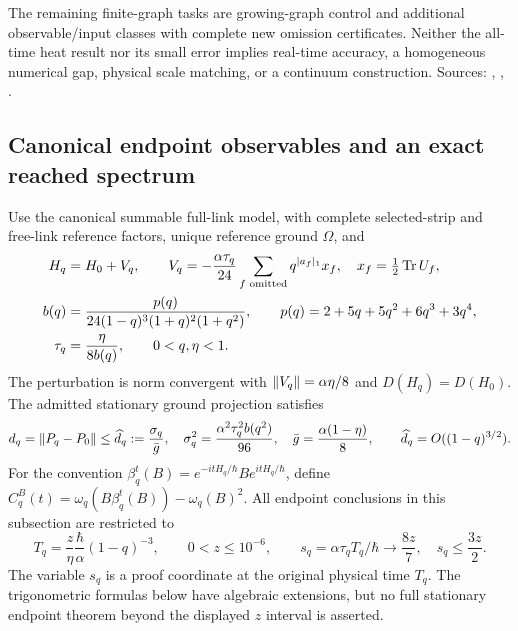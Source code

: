 The remaining finite-graph tasks are growing-graph control and additional
observable/input classes with complete new omission certificates.  Neither the
all-time heat result nor its small error implies real-time accuracy, a
homogeneous numerical gap, physical scale matching, or a continuum construction.
Sources: ,
,
.

\subsection{Canonical endpoint observables and an exact reached spectrum}
\label{recent:canonical}

Use the canonical summable full-link model, with complete selected-strip and
free-link reference factors, unique reference ground $\Omega$, and
\begin{align}
 H_q&=H_0+V_q,\qquad
 V_q=-\frac{\alpha\tau_q}{24}\sum_{f\text{ omitted}}q^{|a_f|_1}x_f,
 \quad x_f=\tfrac12\operatorname{Tr} U_f,\notag\\
 b(q)&=\frac{p(q)}{24(1-q)^3(1+q)^2(1+q^2)},\qquad
 p(q)=2+5q+5q^2+6q^3+3q^4,\notag\\
 \tau_q&=\frac{\eta}{8b(q)},\qquad0<q,\eta<1.
 \label{recent:canonical-profile}
\end{align}
The perturbation is norm convergent with $\left\lVert V_q\right\rVert=\alpha\eta/8$ and
$D(H_q)=D(H_0)$.  The admitted stationary ground projection satisfies
\begin{equation}
 d_q=\left\lVert P_q-P_0\right\rVert\le\widehat d_q:=\frac{\sigma_q}{\bar g},\quad
 \sigma_q^2=\frac{\alpha^2\tau_q^2b(q^2)}{96},\quad
 \bar g=\frac{\alpha(1-\eta)}8,
 \qquad\widehat d_q=O((1-q)^{3/2}).
 \label{recent:canonical-state}
\end{equation}
For the convention $\beta_q^t(B)=e^{-itH_q/\hbar}Be^{itH_q/\hbar}$, define
$C_q^B(t)=\omega_q(B\beta_q^t(B))-\omega_q(B)^2$.
All endpoint conclusions in this subsection are restricted to
\begin{equation}
 T_q=\frac z\eta\frac\hbar\alpha(1-q)^{-3},\qquad
 0<z\le10^{-6},\qquad
 s_q=\alpha\tau_qT_q/\hbar\longrightarrow\frac{8z}{7},\quad s_q\le\frac{3z}{2}.
 \label{recent:endpoint-clock}
\end{equation}
The variable $s_q$ is a proof coordinate at the original physical time $T_q$.
The trigonometric formulas below have algebraic extensions, but no full
stationary endpoint theorem beyond the displayed $z$ interval is asserted.

